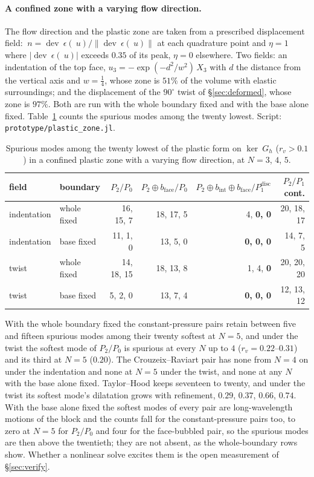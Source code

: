 \documentclass[11pt]{article}
\newcommand{\eps}{~\epsilon}
\newcommand{\dev}{\operatorname{dev}}
\newcommand{\norm}[1]{\left\lVert #1 \right\rVert}
\newcommand{\code}[1]{\texttt{#1}}
\theoremstyle{definition}
\theoremstyle{plain}
\begin{document}
\paragraph{A confined zone with a varying flow direction.} The flow
direction and the plastic zone are taken from a prescribed displacement
field: $~n = \dev\eps(~u)/\norm{\dev\eps(~u)}$ at each quadrature point and
$\eta = 1$ where $\lvert\dev\eps(~u)\rvert$ exceeds $0.35$ of its peak,
$\eta = 0$ elsewhere. Two fields: an indentation of the top face,
$u_3 = -\exp(-d^2/w^2)\,X_3$ with $d$ the distance from the vertical axis and
$w = \tfrac14$, whose zone is $51\%$ of the volume with elastic
surroundings; and the displacement of the $90^\circ$ twist of
\S\ref{sec:deformed}, whose zone is $97\%$. Both are run with the whole
boundary fixed and with the base alone fixed. Table~\ref{tab:zone} counts
the spurious modes among the twenty lowest. Script:
\code{prototype/plastic\_zone.jl}.

\begin{table}[tbp]
\centering
\caption{Spurious modes among the twenty lowest of the plastic form on
$\ker ~G_h$ ($r_v > 0.1$) in a confined plastic zone with a varying flow
direction, at $N = 3$, $4$, $5$.}
\label{tab:zone}
\begin{tabular}{@{}llrrrr@{}}
\toprule
field & boundary & $P_2/P_0$ & $P_2 \oplus b_{\mathrm{face}}/P_0$
      & $P_2 \oplus b_{\mathrm{int}} \oplus b_{\mathrm{face}}/P_1^{\mathrm{disc}}$
      & $P_2/P_1$ cont. \\
\midrule
indentation & whole fixed & 16, 15, 7  & 18, 17, 5  & 4, \textbf{0, 0} & 20, 18, 17 \\
indentation & base fixed & 11, 1, 0   & 13, 5, 0   & \textbf{0, 0, 0} & 14, 7, 5 \\
twist       & whole fixed & 14, 18, 15 & 18, 13, 8  & 1, 4, \textbf{0} & 20, 20, 20 \\
twist       & base fixed & 5, 2, 0    & 13, 7, 4   & \textbf{0, 0, 0} & 12, 13, 12 \\
\bottomrule
\end{tabular}
\end{table}

With the whole boundary fixed the constant-pressure pairs retain between
five and fifteen spurious modes among their twenty softest at $N = 5$, and
under the twist the softest mode of $P_2/P_0$ is spurious at every $N$ up to
$4$ ($r_v = 0.22$--$0.31$) and its third at $N = 5$ ($0.20$). The
Crouzeix--Raviart pair has none from $N = 4$ on under the indentation and
none at $N = 5$ under the twist, and none at any $N$ with the base alone
fixed. Taylor--Hood keeps seventeen to twenty, and under the twist its
softest mode's dilatation grows with refinement, $0.29$, $0.37$, $0.66$,
$0.74$. With the base alone fixed the softest modes of every pair are
long-wavelength motions of the block and the counts fall for the
constant-pressure pairs too, to zero at $N = 5$ for $P_2/P_0$ and four for
the face-bubbled pair, so the spurious modes are then above the twentieth;
they are not absent, as the whole-boundary rows show. Whether a nonlinear
solve excites them is the open measurement of \S\ref{sec:verify}.
\end{document}
